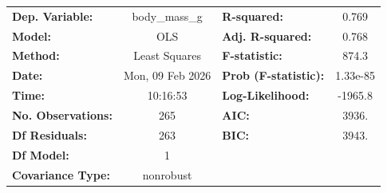 \begin{center}
\begin{tabular}{lclc}
\toprule
\textbf{Dep. Variable:}    &  body\_mass\_g   & \textbf{  R-squared:         } &    0.769  \\
\textbf{Model:}            &       OLS        & \textbf{  Adj. R-squared:    } &    0.768  \\
\textbf{Method:}           &  Least Squares   & \textbf{  F-statistic:       } &    874.3  \\
\textbf{Date:}             & Mon, 09 Feb 2026 & \textbf{  Prob (F-statistic):} & 1.33e-85  \\
\textbf{Time:}             &     10:16:53     & \textbf{  Log-Likelihood:    } &  -1965.8  \\
\textbf{No. Observations:} &         265      & \textbf{  AIC:               } &    3936.  \\
\textbf{Df Residuals:}     &         263      & \textbf{  BIC:               } &    3943.  \\
\textbf{Df Model:}         &           1      & \textbf{                     } &           \\
\textbf{Covariance Type:}  &    nonrobust     & \textbf{                     } &           \\
\bottomrule
\end{tabular}
\end{center}